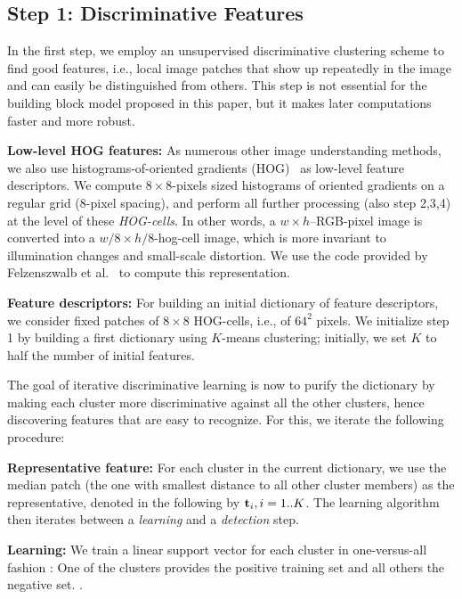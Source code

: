 \documentclass{acmtog}
\begin{document}
\subsection{Step 1: Discriminative Features}
\label{sec:IterativeDL}

In the first step, we employ an unsupervised discriminative clustering scheme to find good features, i.e., local image patches that show up repeatedly in the image and can easily be distinguished from others. This step is not essential for the building block model proposed in this paper, but it makes later computations faster and more robust. %

\textbf{Low-level HOG features:} As numerous other image understanding methods, we also use histograms-of-oriented gradients (HOG)~\cite{DALALcvpr2005} as low-level feature descriptors. We compute $8\times 8$-pixels sized histograms of oriented gradients on a regular grid (8-pixel spacing), and perform all further processing (also step 2,3,4) at the level of these \emph{HOG-cells}. In other words, a $w \times h$--RGB-pixel image is converted into a $w/8 \times h/8$-hog-cell image, which is more invariant to illumination changes and small-scale distortion. We use the code provided by Felzenszwalb et al.~ to compute this representation.

\textbf{Feature descriptors:} For building an initial dictionary of feature descriptors, we consider fixed patches of $8 \times 8$ HOG-cells, i.e., of $64^2$ pixels. We initialize step 1 by building a first dictionary using $K$-means clustering; initially, we set $K$ to half the number of initial features.

The goal of iterative discriminative learning is now to purify the dictionary by making each cluster more discriminative against all the other clusters, hence discovering features that are easy to recognize. For this, we iterate the following procedure:
 
\textbf{Representative feature:} For each cluster in the current dictionary, we use the median patch (the one with smallest distance to all other cluster members) as the representative, denoted in the following by $\mathbf{t}_i, i = 1..K$. The learning algorithm then iterates between a \emph{learning} and a \emph{detection} step.

\textbf{Learning:} We train a linear support vector for each cluster in one-versus-all fashion : One of the clusters provides the positive training set and all others the negative set. .
\end{document}
